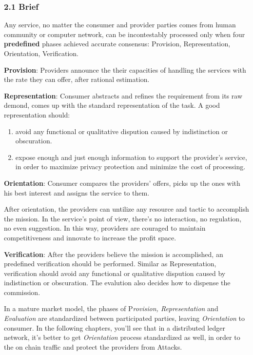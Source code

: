 \documentclass[11pt]{article}
\providecommand{\tightlist}{%
      \setlength{\itemsep}{0pt}\setlength{\parskip}{0pt}}
\begin{document}
\subsubsection{2.1 Brief}\label{brief}

Any service, no matter the consumer and provider parties comes from
human community or computer network, can be incontestably processed only
when four \textbf{predefined} phases achieved accurate consensus:
Provision, Representation, Orientation, Verification.

\textbf{Provision}: Providers announce the their capacities of handling
the services with the rate they can offer, after rational estimation.

\textbf{Representation}: Consumer abstracts and refines the requirement
from its raw demond, comes up with the standard representation of the
task. A good representation should:

\begin{enumerate}
\def\labelenumi{\arabic{enumi}.}
\tightlist
\item
  avoid any functional or qualitative dispution caused by indistinction
  or obscuration.
\item
  expose enough and just enough information to support the provider's
  service, in order to maximize privacy protection and minimize the cost
  of processing.
\end{enumerate}

\textbf{Orientation}: Consumer compares the providers' offers, picks up
the ones with his best interest and assigns the service to them.

After orientation, the providers can untilize any resource and tactic to
accomplish the mission. In the service's point of view, there's no
interaction, no regulation, no even suggestion. In this way, providers
are couraged to maintain competitiveness and innovate to increase the
profit space.

\textbf{Verification}: After the providers believe the mission is
accomplished, an predefined verification should be performed. Similar as
Representation, verification should avoid any functional or qualitative
dispution caused by indistinction or obscuration. The evalution also
decides how to dispense the commission.

In a mature market model, the phases of P\emph{rovision, Representation}
and \emph{Evaluation} are standardized between participated parties,
leaving \emph{Orientation} to consumer. In the following chapters,
you'll see that in a distributed ledger network, it's better to get
\emph{Orientation} process standardized as well, in order to the on
chain traffic and protect the providers from Attacks.
\end{document}
